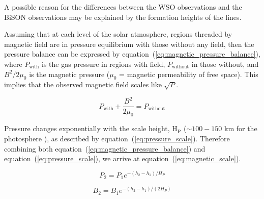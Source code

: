 A possible reason for the differences between the WSO observations and the BiSON observations may be explained by the formation heights of the lines. 

Assuming that at each level of the solar atmosphere, regions threaded by magnetic field are in pressure equilibrium with those without any field, then the pressure balance can be expressed by equation~(\ref{eq:magnetic_pressure_balance}), where $P_\mathrm{with}$ is the gas pressure in regions with field, $P_\mathrm{without}$ in those without, and $B^2/2\mu_0$ is the magnetic pressure ($\mu_0$ = magnetic permeability of free space). This implies that the observed magnetic field scales like $\sqrt{P}$.

\begin{equation}
P_\mathrm{with} + \frac{B^2}{2\mu_0} = P_\mathrm{without}
\label{eq:magnetic_pressure_balance}
\end{equation}

Pressure changes exponentially with the scale height, H$_\mathrm{P}$ ($\sim 100-150$ km for the photosphere \citep{christensen-dalsgaard_current_1996}), as described by equation~(\ref{eq:pressure_scale}). Therefore combining both equation~(\ref{eq:magnetic_pressure_balance}) and equation~(\ref{eq:pressure_scale}), we arrive at equation~(\ref{eq:magnetic_scale}).

\begin{equation}
P_2 = P_1 e^{ - (h_2-h_1)/H_P}
\label{eq:pressure_scale}
\end{equation}

\begin{equation}
B_2 = B_1 e^{ - (h_2-h_1)/(2H_P)}
\label{eq:magnetic_scale}
\end{equation} 


